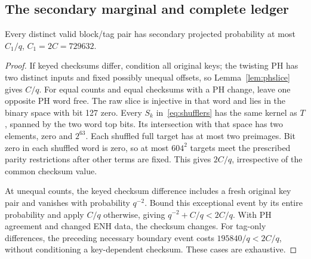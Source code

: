 \subsection{The secondary marginal and complete ledger}
\begin{lemma}\label{lem:secondary}
Every distinct valid block/tag pair has secondary projected probability at most $C_1/q$, $C_1=2C=729632$.
\end{lemma}
\begin{proof}
If keyed checksums differ, condition all original keys; the twisting PH has two distinct inputs and fixed possibly unequal offsets, so Lemma~\ref{lem:phslice} gives $C/q$.
For equal counts and equal checksums with a PH change, leave one opposite PH word free. The raw slice is injective in that word and lies in the binary space with bit 127 zero. Every $S_k$ in~\eqref{eq:shufflers} has the same kernel as $T$, spanned by the two word top bits. Its intersection with that space has two elements, zero and $2^{63}$. Each shuffled full target has at most two preimages. Bit zero in each shuffled word is zero, so at most $604^2$ targets meet the prescribed parity restrictions after other terms are fixed. This gives $2C/q$, irrespective of the common checksum value.

At unequal counts, the keyed checksum difference includes a fresh original key pair and vanishes with probability $q^{-2}$. Bound this exceptional event by its entire probability and apply $C/q$ otherwise, giving $q^{-2}+C/q<2C/q$. With PH agreement and changed ENH data, the checksum changes. For tag-only differences, the preceding necessary boundary event costs $195840/q<2C/q$, without conditioning a key-dependent checksum. These cases are exhaustive.
\end{proof}

